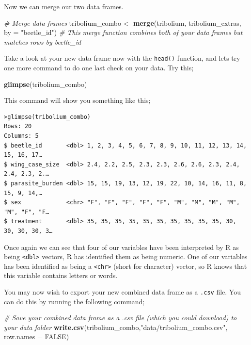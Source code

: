 \documentclass[
]{book}
\newenvironment{Shaded}{\begin{snugshade}}{\end{snugshade}}
\newcommand{\AttributeTok}[1]{\textcolor[rgb]{0.13,0.29,0.53}{#1}}
\newcommand{\CommentTok}[1]{\textcolor[rgb]{0.56,0.35,0.01}{\textit{#1}}}
\newcommand{\ConstantTok}[1]{\textcolor[rgb]{0.56,0.35,0.01}{#1}}
\newcommand{\FunctionTok}[1]{\textcolor[rgb]{0.13,0.29,0.53}{\textbf{#1}}}
\newcommand{\NormalTok}[1]{#1}
\newcommand{\OtherTok}[1]{\textcolor[rgb]{0.56,0.35,0.01}{#1}}
\newcommand{\StringTok}[1]{\textcolor[rgb]{0.31,0.60,0.02}{#1}}
\begin{document}
Now we can merge our two data frames.

\begin{Shaded}
\begin{Highlighting}[]
\CommentTok{\# Merge data frames}
\NormalTok{tribolium\_combo }\OtherTok{\textless{}{-}} \FunctionTok{merge}\NormalTok{(tribolium, tribolium\_extras, }\AttributeTok{by =} \StringTok{"beetle\_id"}\NormalTok{)}
\CommentTok{\# This merge function combines both of your data frames but matches rows by beetle\_id}
\end{Highlighting}
\end{Shaded}

Take a look at your new data frame now with the \texttt{head()} function, and lets try one more command to do one last check on your data. Try this;

\begin{Shaded}
\begin{Highlighting}[]
\FunctionTok{glimpse}\NormalTok{(tribolium\_combo)}
\end{Highlighting}
\end{Shaded}

This command will show you something like this;

\begin{verbatim}
>glimpse(tribolium_combo)
Rows: 20
Columns: 5
$ beetle_id       <dbl> 1, 2, 3, 4, 5, 6, 7, 8, 9, 10, 11, 12, 13, 14, 15, 16, 17…
$ wing_case_size  <dbl> 2.4, 2.2, 2.5, 2.3, 2.3, 2.6, 2.6, 2.3, 2.4, 2.4, 2.3, 2.…
$ parasite_burden <dbl> 15, 15, 19, 13, 12, 19, 22, 10, 14, 16, 11, 8, 15, 9, 14,…
$ sex             <chr> "F", "F", "F", "F", "F", "M", "M", "M", "M", "M", "F", "F…
$ treatment       <dbl> 35, 35, 35, 35, 35, 35, 35, 35, 35, 35, 30, 30, 30, 30, 3…
\end{verbatim}

Once again we can see that four of our variables have been interpreted by R as being \texttt{\textless{}dbl\textgreater{}} vectors, R has identified them as being numeric. One of our variables has been identified as being a \texttt{\textless{}chr\textgreater{}} (short for character) vector, so R knows that this variable contains letters or words.

You may now wish to export your new combined data frame as a \texttt{.csv} file. You can do this by running the following command;

\begin{Shaded}
\begin{Highlighting}[]
\CommentTok{\# Save your combined data frame as a .csv file (which you could download) to your data folder}
\FunctionTok{write.csv}\NormalTok{(tribolium\_combo,}\StringTok{"data/tribolium\_combo.csv"}\NormalTok{, }\AttributeTok{row.names =} \ConstantTok{FALSE}\NormalTok{)}
\end{Highlighting}
\end{Shaded}
\end{document}
